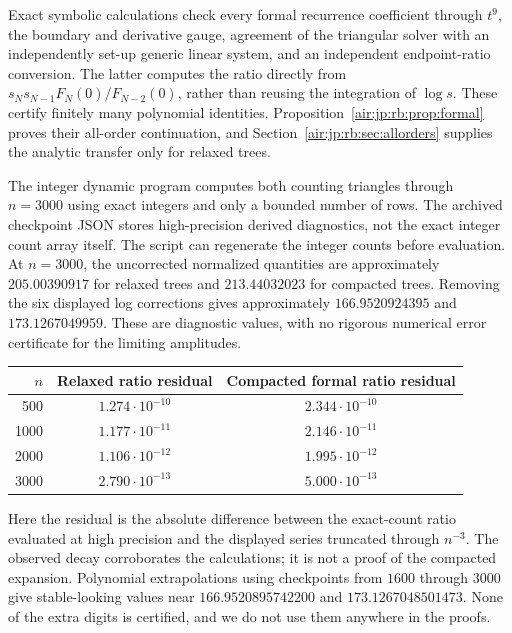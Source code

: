\documentclass[11pt,letterpaper]{article}
\numberwithin{equation}{section}
\theoremstyle{remark}
\begin{document}
Exact symbolic calculations check every formal recurrence coefficient through $t^9$, the boundary and derivative gauge, agreement of the triangular solver with an independently set-up generic linear system, and an independent endpoint-ratio conversion. The latter computes the ratio directly from $s_Ns_{N-1}F_N(0)/F_{N-2}(0)$, rather than reusing the integration of $\log s$. These certify finitely many polynomial identities. Proposition~\ref{air:jp:rb:prop:formal} proves their all-order continuation, and Section~\ref{air:jp:rb:sec:allorders} supplies the analytic transfer only for relaxed trees.

The integer dynamic program computes both counting triangles through $n=3000$ using exact integers and only a bounded number of rows. The archived checkpoint JSON stores high-precision derived diagnostics, not the exact integer count array itself. The script can regenerate the integer counts before evaluation. At $n=3000$, the uncorrected normalized quantities are approximately $205.00390917$ for relaxed trees and $213.44032023$ for compacted trees. Removing the six displayed log corrections gives approximately $166.9520924395$ and $173.1267049959$. These are diagnostic values, with no rigorous numerical error certificate for the limiting amplitudes.

\begin{center}
\begin{tabular}{rcc}
\toprule
$n$ & Relaxed ratio residual & Compacted formal ratio residual\\
\midrule
500 & $1.274\cdot10^{-10}$ & $2.344\cdot10^{-10}$\\
1000 & $1.177\cdot10^{-11}$ & $2.146\cdot10^{-11}$\\
2000 & $1.106\cdot10^{-12}$ & $1.995\cdot10^{-12}$\\
3000 & $2.790\cdot10^{-13}$ & $5.000\cdot10^{-13}$\\
\bottomrule
\end{tabular}
\end{center}
Here the residual is the absolute difference between the exact-count ratio evaluated at high precision and the displayed series truncated through $n^{-3}$. The observed decay corroborates the calculations; it is not a proof of the compacted expansion. Polynomial extrapolations using checkpoints from $1600$ through $3000$ give stable-looking values near $166.9520895742200$ and $173.1267048501473$. None of the extra digits is certified, and we do not use them anywhere in the proofs.
\end{document}
